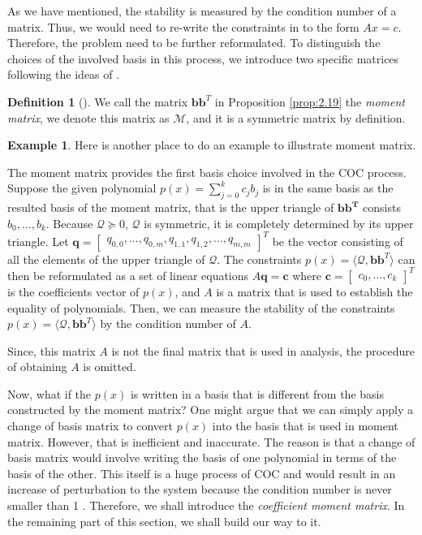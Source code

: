 \documentclass[12pt]{amsart}
\numberwithin{equation}{section}
\theoremstyle{definition}
\newtheorem{definition}[thm]{Definition}
\newtheorem{example}[thm]{Example}
\numberwithin{thm}{section}
\begin{document}
As we have mentioned, the stability is measured by the condition number of a matrix. 
Thus, we would need to re-write the constraints in to the form $A x = c$. 
Therefore, the problem need to be further reformulated. 
To distinguish the choices of the involved basis in this process, we introduce two specific matrices following the ideas of \cite{Recher:Masterthesis}.

\begin{definition}[\cite{Recher:Masterthesis}]
     We call the matrix $\mathbf{bb}^T$ in Proposition \ref{prop:2.19} the \emph{moment matrix}, we denote this matrix as $\mathcal{M}$, and it is a symmetric matrix by definition.
\end{definition}

\begin{example}
     Here is another place to do an example to illustrate moment matrix.
\end{example}

\smallskip
The moment matrix provides the first basis choice involved in the COC process. 
Suppose the given polynomial $p(x) = \sum_{j = 0} ^ k c_j b_j$ 
is in the same basis as the resulted basis of the moment matrix, 
that is the upper triangle of $\mathbf{bb^T}$ consists $b_0, ..., b_k$. 
Because $\mathcal{Q} \succcurlyeq 0$, $\mathcal{Q}$ is symmetric, 
it is completely determined by its upper triangle.
Let $\mathbf{q} = \begin{bmatrix} q_{0,0}, ..., q_{0, m}, q_{1,1}, q_{1, 2}, ..., q_{m, m} \end{bmatrix}^T$ 
be the vector consisting of all the elements of the upper triangle of $\mathcal{Q}$.
The constraints $p(x) = \langle \mathcal{Q}, \mathbf{bb}^T \rangle$ can then be reformulated as a set of linear equations 
$A \mathbf{q} = \mathbf{c}$ where $ \mathbf{c} = \begin{bmatrix}
     c_0, ..., c_k
\end{bmatrix}^T$ 
is the coefficients vector of $p(x)$, 
and $A$ is a matrix that is used to establish the equality of polynomials. 
Then, we can measure the stability of the constraints $p(x) = \langle \mathcal{Q}, \mathbf{bb}^T \rangle$ by the condition number of $A$. 

Since, this matrix $A$ is not the final matrix that is used in analysis, the procedure of obtaining $A$ is omitted. 

\smallskip

Now, what if the $p(x)$ is written in a basis that is different from the basis constructed by the moment matrix?
One might argue that we can simply apply a change of basis matrix to convert $p(x)$ into the basis that is used in moment matrix. 
However, that is inefficient and inaccurate. 
The reason is that a change of basis matrix would involve writing the basis of one polynomial in terms of the basis of the other. 
This itself is a huge process of COC and would result in an increase of perturbation to the system because the condition number is never smaller than 1 \cite{golub1996matrix}.
Therefore, we shall introduce the \emph{coefficient moment matrix}. In the remaining part of this section, we shall build our way to it.
\end{document}
